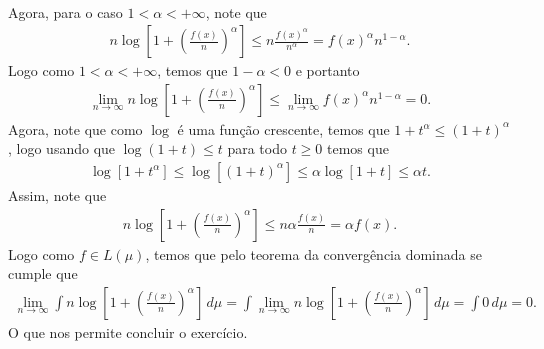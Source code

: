 \begin{homeworkProblem}[7]
\begin{solution}
\begin{align*}
    \end{align*}
    Agora, para o caso $1<\alpha<+\infty$, note que
    \begin{align*}
      n\log\left[ 1+\left( \frac{f(x)}{n} \right)^{\alpha} \right]\leq n\frac{f(x)^{\alpha}}{n^{\alpha}}=f(x)^{\alpha}n^{1-\alpha}.
    \end{align*}
    Logo como $1<\alpha<+\infty$, temos que $1-\alpha<0$ e portanto
    \begin{align*}
      \lim_{n \to \infty}n\log\left[ 1+\left( \frac{f(x)}{n} \right)^{\alpha} \right]\leq \lim_{n \to \infty}f(x)^{\alpha}n^{1-\alpha}=0.
    \end{align*}
    Agora, note que como $\log$ é uma função crescente, temos que $1+t^{\alpha}\leq (1+t)^{\alpha}$, logo usando que $\log(1+t)\leq t$ para todo $t\geq 0$ temos que
    \begin{align*}
      \log\left[ 1+t^{\alpha} \right]\leq \log\left[ (1+t)^{\alpha} \right]\leq \alpha\log\left[ 1+t \right]\leq \alpha t.
    \end{align*}
    Assim, note que
    \begin{align*}
      n\log\left[ 1+\left( \frac{f(x)}{n} \right)^{\alpha} \right]\leq n\alpha\frac{f(x)}{n}=\alpha f(x).
    \end{align*}
    Logo como $f\in L(\mu)$, temos que pelo teorema da convergência dominada se cumple que
    \begin{align*}
      \lim_{n \to \infty}\int n\log\left[ 1+\left(\frac{f(x)}{n}\right)^{\alpha} \right]\,d\mu=\int \lim_{n \to \infty}n\log\left[ 1+\left(\frac{f(x)}{n}\right)^{\alpha} \right]\,d\mu=\int 0\,d\mu=0.
    \end{align*}
    O que nos permite concluir o exercício.
  \end{solution}
\end{homeworkProblem}
